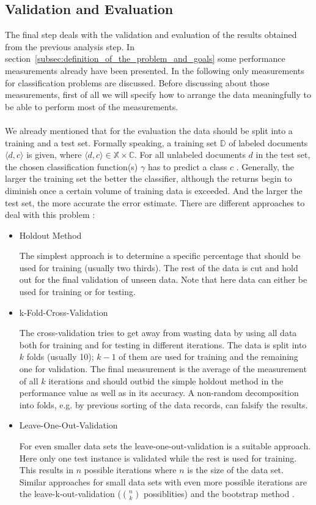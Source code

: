 \documentclass[article,type=msc,colorback,accentcolor=tud7b]{tudthesis}
\begin{document}
  \subsection{Validation and Evaluation}
  \label{subsec:validation_and_evaluation}
    The final step deals with the validation and evaluation of the results obtained from the previous analysis step. In section~\ref{subsec:definition_of_the_problem_and_goals} some performance measurements already have been presented. In the following only measurements for classification problems are discussed. Before discussing about those measurements, first of all we will specify how to arrange the data meaningfully to be able to perform most of the measurements. \\\\
    We already mentioned that for the evaluation the data should be split into a training and a test set. Formally speaking, a training set $\mathbb{D}$ of labeled documents $\langle d,c\rangle$ is given, where $\langle d,c\rangle\in\mathbb{X}\times\mathbb{C}$. For all unlabeled documents $d$ in the test set, the chosen classification function(s) $\gamma$ has to predict a class $c$ \autocite[section~13.1]{Manning2008}. Generally, the larger the training set the better the classifier, although the returns begin to diminish once a certain volume of training data is exceeded. And the larger the test set, the more accurate the error estimate. There are different approaches to deal with this problem \autocite[chapter~5]{Witten2005}:
    \begin{itemize}
      \item Holdout Method
      
        The simplest approach is to determine a specific percentage that should be used for training (usually two thirds). The rest of the data is cut and hold out for the final validation of unseen data. Note that here data can either be used for training or for testing.
      \item k-Fold-Cross-Validation
      
        The cross-validation tries to get away from wasting data by using all data both for training and for testing in different iterations. The data is split into $k$ folds (usually 10); $k-1$ of them are used for training and the remaining one for validation. The final measurement is the average of the measurement of all $k$ iterations and should outbid the simple holdout method in the performance value as well as in its accuracy. A non-random decomposition into folds, e.g. by previous sorting of the data records, can falsify the results.
      \item Leave-One-Out-Validation
      
        For even smaller data sets the leave-one-out-validation is a suitable approach. Here only one test instance is validated while the rest is used for training. This results in $n$ possible iterations where $n$ is the size of the data set. Similar approaches for small data sets with even more possible iterations are the leave-k-out-validation ($\binom{n}{k}$ possiblities) and the bootstrap method \autocite[chapter~4]{Arlot2010}.
    \end{itemize}
\end{document}
